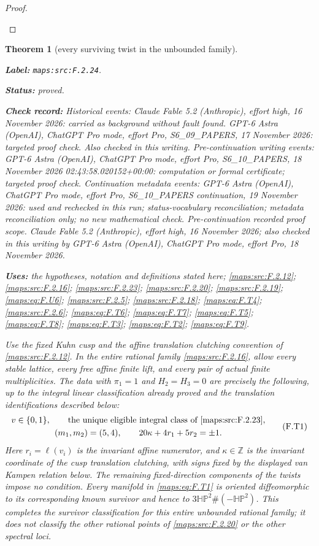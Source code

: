 \documentclass[11pt,a4paper]{article}
\newtheorem{theorem}{Theorem}[section]
\theoremstyle{definition}
\newcommand{\StatementRecord}[4]{\par\smallskip\begingroup\upshape\raggedright\noindent\textbf{Label:} \nolinkurl{#1}.\par\noindent\textbf{Status:} #2.\par\noindent\textbf{Check record:} #3.\par\noindent\textbf{Uses:} #4.\par\endgroup\smallskip}
\begin{document}
\begin{proof}
\begin{enumerate}[label=\arabic*.]
\end{enumerate}
\end{proof}




\begin{theorem}[every surviving twist in the unbounded family]\label{maps:src:F.2.24}
\StatementRecord{maps:src:F.2.24}{proved}{Historical events: Claude Fable 5.2 (Anthropic), effort high, 16 November 2026: carried as background without fault found. GPT-6 Astra (OpenAI), ChatGPT Pro mode, effort Pro, S6\_09\_PAPERS, 17 November 2026: targeted proof check. Also checked in this writing. Pre-continuation writing events: GPT-6 Astra (OpenAI), ChatGPT Pro mode, effort Pro, S6\_10\_PAPERS, 18 November 2026 02:43:58.020152+00:00: computation or formal certificate; targeted proof check. Continuation metadata events: GPT-6 Astra (OpenAI), ChatGPT Pro mode, effort Pro, S6\_10\_PAPERS continuation, 19 November 2026: used and rechecked in this run; status-vocabulary reconciliation; metadata reconciliation only; no new mathematical check. \emph{Pre-continuation recorded proof scope.} Claude Fable 5.2 (Anthropic), effort high, 16 November 2026; also checked in this writing by GPT-6 Astra (OpenAI), ChatGPT Pro mode, effort Pro, 18 November 2026}{the hypotheses, notation and definitions stated here; \cref{maps:src:F.2.12}; \cref{maps:src:F.2.16}; \cref{maps:src:F.2.23}; \cref{maps:src:F.2.20}; \cref{maps:src:F.2.19}; \cref{maps:eq:F.U6}; \cref{maps:src:F.2.5}; \cref{maps:src:F.2.18}; \cref{maps:eq:F.T4}; \cref{maps:src:F.2.6}; \cref{maps:eq:F.T6}; \cref{maps:eq:F.T7}; \cref{maps:eq:F.T5}; \cref{maps:eq:F.T8}; \cref{maps:eq:F.T3}; \cref{maps:eq:F.T2}; \cref{maps:eq:F.T9}}


Use the fixed Kuhn cusp and the affine translation clutching
convention of \ref{maps:src:F.2.12}.  In the entire rational family \ref{maps:src:F.2.16},
allow every stable lattice, every free affine finite lift,
and every pair of actual finite multiplicities.
The data with $\pi_1=1$ and $H_2=H_3=0$ are precisely the
following, up to the integral linear classification already
proved and the translation identifications described below:
\[
\begin{gathered}
 v\in\{0,1\},\qquad
 \text{the unique eligible integral class of \ref{maps:src:F.2.23}},\\
 (m_1,m_2)=(5,4),\qquad
 20\kappa+4r_1+5r_2=\pm1.
\end{gathered}
 \tag{F.T1}\label{maps:eq:F.T1}
\]
Here $r_i=\ell(v_i)$ is the invariant affine numerator, and
$\kappa\in\mathbb Z$ is the invariant coordinate of the
cusp translation clutching, with signs fixed by the displayed
van Kampen relation below.  The remaining fixed-direction
components of the twists impose no condition.
Every manifold in \eqref{maps:eq:F.T1} is oriented diffeomorphic to its
corresponding known survivor and hence to
$3\mathbb{HP}^2\#(-\mathbb{HP}^2)$.
This completes the survivor classification for this entire
unbounded rational family; it does not classify the other
rational points of \ref{maps:src:F.2.20} or the other spectral loci.

\end{theorem}
\end{document}
